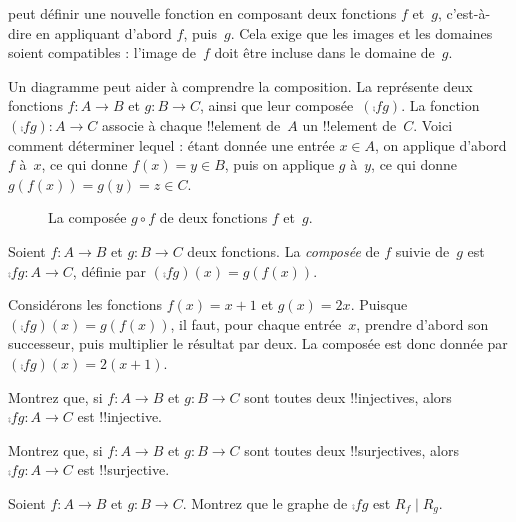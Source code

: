 \documentclass[../../../include/open-logic-section]{subfiles}
\begin{document}

\begin{explain}
peut définir une nouvelle fonction en composant deux fonctions $f$ et~$g$,
c’est-à-dire en appliquant d’abord $f$, puis~$g$. Cela exige que les
images et les domaines soient compatibles : l’image de~$f$ doit être
incluse dans le domaine de~$g$.

Un diagramme peut aider à comprendre la composition. La
 représente deux fonctions $f\colon A \to B$
et $g\colon B \to C$, ainsi que leur composée~$(\comp{f}{g})$.
La fonction $(\comp{f}{g})\colon A \to C$ associe à chaque !!{element}
de~$A$ un !!{element} de~$C$. Voici comment déterminer lequel :
étant donnée une entrée $x \in A$, on applique d’abord $f$ à~$x$,
ce qui donne $f(x) = y \in B$, puis on applique $g$ à~$y$,
ce qui donne $g(f(x)) = g(y) = z \in C$.
\begin{figure}
  \caption{La composée $g \circ f$ de deux fonctions $f$ et~$g$.}
\end{figure}
\end{explain}

\begin{defn}[Composition]
Soient $f\colon A \to B$ et $g\colon B \to C$ deux fonctions.
La \emph{composée} de $f$ suivie de~$g$ est
$\comp{f}{g}\colon A \to C$, définie par
$(\comp{f}{g})(x) = g(f(x))$.
\end{defn}

\begin{ex}
Considérons les fonctions $f(x) = x + 1$ et $g(x) = 2x$.
Puisque $(\comp{f}{g})(x) = g(f(x))$, il faut, pour chaque entrée~$x$,
prendre d’abord son successeur, puis multiplier le résultat par deux.
La composée est donc donnée par $(\comp{f}{g})(x) = 2(x+1)$.
\end{ex}

\begin{prob}
Montrez que, si $f\colon A \to B$ et $g\colon B \to C$ sont toutes deux
!!{injective}s, alors $\comp{f}{g}\colon A \to C$ est !!{injective}.
\end{prob}

\begin{prob}
Montrez que, si $f\colon A \to B$ et $g\colon B \to C$ sont toutes deux
!!{surjective}s, alors $\comp{f}{g}\colon A \to C$ est !!{surjective}.
\end{prob}

\begin{prob}
Soient $f\colon A \to B$ et $g\colon B \to C$. Montrez que le graphe
de $\comp{f}{g}$ est $R_f \mid R_g$.
\end{prob}
\end{document}

